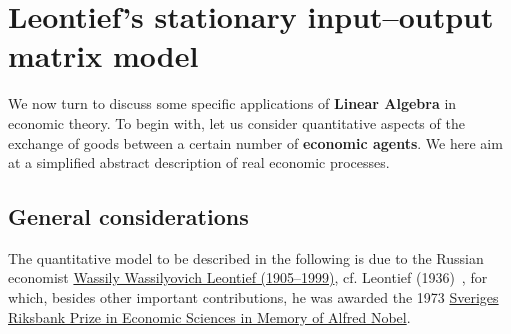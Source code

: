 \chapter[Leontief's 
input--output matrix model]{Leontief's stationary
input--output matrix model}

\vspace{10mm}
\noindent
We now turn to discuss some specific applications of {\bf Linear 
Algebra} in economic theory. To begin with, let us consider 
quantitative aspects of the exchange of goods between a certain 
number of {\bf economic agents}. We here aim at a simplified 
abstract description of real economic processes.

\section[General considerations]%
{General considerations}
The quantitative model to be described in the following is due to 
the Russian economist 
\href{http://en.wikipedia.org/wiki/Leontief}{Wassily Wassilyovich 
Leontief (1905--1999)}, cf. Leontief (1936)~, for 
which, besides other important contributions, he was awarded the 
1973 
\href{http://www.nobelprize.org/nobel_prizes/economics/laureates/1973/}{Sveriges Riksbank Prize in Economic Sciences in Memory of 
Alfred Nobel}. 

